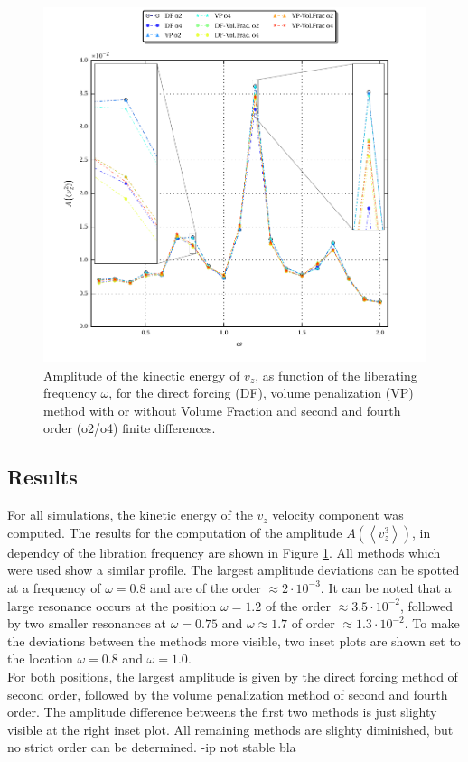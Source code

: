 \clearpage

\begin{figure}[!p]
  \centering
  \includegraphics{gfx/cone/cylinder/cylinder.pdf}  \caption{\label{fig:cone:cyl}
    Amplitude of the kinectic energy of $v_z$, as function of the liberating frequency $\omega$,
   for the direct forcing (DF), volume penalization (VP) method with or without Volume Fraction and
      second and fourth order (o2/o4) finite differences.}
\end{figure}
\newpage

\clearpage

\subsection{Results}

For all simulations, the kinetic energy of the $v_z$ velocity component was computed.
The results for the computation of the amplitude $A\left(\left<v_z^3\right>\right)$, in dependcy of the libration
frequency are shown in Figure \ref{fig:cone:cyl}.
All methods which were used show a similar profile.
The largest amplitude deviations can be spotted at a frequency of $\omega=0.8$ and are of the order $\approx2\cdot10^{-3}$.
It can be noted that a large resonance  occurs at the position $\omega=1.2$ of the order $\approx3.5\cdot10^{-2}$, followed by two
smaller resonances at $\omega=0.75$ and $\omega\approx1.7$ of order $\approx1.3\cdot10^{-2}$.
To make the deviations between the methods more visible, two inset plots are shown
set to the location $\omega=0.8$ and $\omega=1.0$.\\
For both positions, the largest amplitude is given by the direct forcing method of second order, followed by
the volume penalization method of second and fourth order.
The amplitude difference betweens the first two methods is just slighty visible at the right inset plot.
All remaining methods are slighty diminished, but no strict order can be determined.
-ip not stable bla



